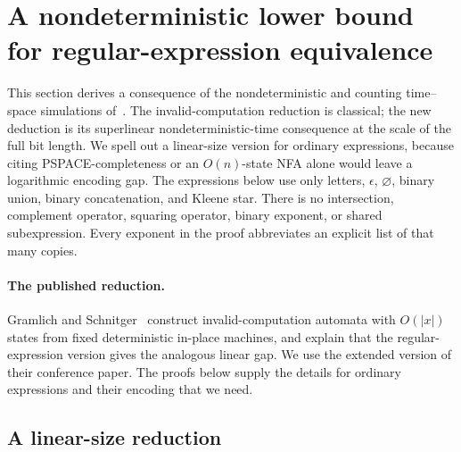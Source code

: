 \documentclass[11pt]{article}
\theoremstyle{definition}
\theoremstyle{remark}
\begin{document}
\section{A nondeterministic lower bound for regular-expression equivalence}
\label{sec:regex-lower}

This section derives a consequence of the nondeterministic and counting
time--space simulations of~\cite{Cruz26}. The invalid-computation
reduction is classical; the new deduction is its superlinear
nondeterministic-time consequence at the scale of the full bit length.
We spell out a linear-size version for ordinary expressions, because
citing PSPACE-completeness or an $O(n)$-state NFA alone would leave a
logarithmic encoding gap. The expressions below use only letters,
$\epsilon$, $\varnothing$, binary union, binary concatenation, and
Kleene star. There is no intersection, complement operator, squaring
operator, binary exponent, or shared subexpression. Every exponent in
the proof abbreviates an explicit list of that many copies.

\paragraph{The published reduction.}
Gramlich and Schnitger~\cite[Lemma~7 and the appendix proof of
Theorem~4]{GS05} construct invalid-computation automata with $O(|x|)$
states from fixed deterministic in-place machines, and explain that
the regular-expression version gives the analogous linear gap. We use
the extended version of their conference paper. The proofs below supply
the details for ordinary expressions and their encoding that we need.

\subsection{A linear-size reduction}
\end{document}
